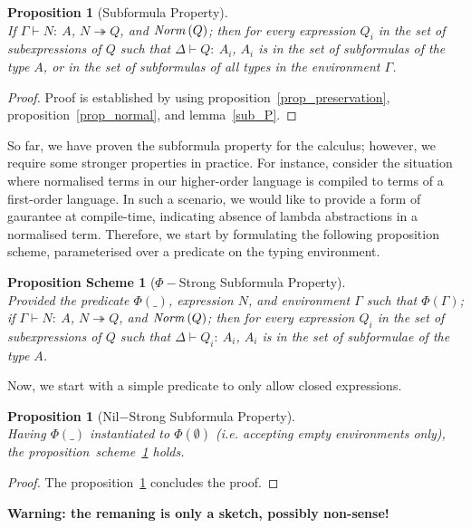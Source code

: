 \documentclass[a4paper]{article}
\newcommand{\typecolor}{}
\newcommand{\termcolor}{}
\newcommand{\tp}[1]{{\typecolor #1}}
\newcommand{\tm}[1]{{\termcolor #1}}
\newtheorem{proposition}[theorem]{Proposition}
\newtheorem{scheme}[theorem]{Proposition Scheme}
\newcommand{\envemp}{\tp{\boldsymbol{\emptyset}}}
\newcommand{\typing}[2]{\tm{#1:\ }\tp{#2}}
\newcommand{\txt}[1]{\text{\textit{#1}}}
\newcommand{\reducestar}[3]{#1 \overset{#2}\twoheadrightarrow #3}
\newcommand{\norm}[1]{\txt{Norm}\,(#1)}
\begin{document}
\begin{proposition}[Subformula Property]\ \\
\label{prop_subformula}
If $\Gamma \vdash \typing{N}{A}$, $\reducestar{N}{}{Q}$, and $\norm{Q}$;
then for every expression $Q_i$ in the set of subexpressions of $Q$ such
that $\Delta \vdash \typing{Q}{A_i}$, $A_i$ is in the set of subformulas of
the type $A$, or in the set of subformulas of all types in the
environment $\Gamma$.
\end{proposition}
\begin{proof}
Proof is established by using proposition~\ref{prop_preservation},
proposition~\ref{prop_normal}, and lemma~\ref{sub_P}.
\end{proof}

So far, we have proven the subformula property for the calculus;
however, we require some stronger properties in practice. For
instance, consider the situation where normalised terms in our
higher-order language is compiled to terms of a first-order
language. In such a scenario, we would like to provide a form of
gaurantee at compile-time, indicating absence of lambda abstractions
in a normalised term. Therefore, we start by formulating the following
proposition scheme, parameterised over a predicate on the typing
environment.

\begin{scheme}[$\Phi-$Strong Subformula Property]\ \\
\label{sub_scheme}
Provided the predicate $\Phi(\_)$, expression $N$, and environment
$\Gamma$ such that $\Phi(\Gamma)$; if $\Gamma \vdash \typing{N}{A}$,
$\reducestar{N}{}{Q}$, and $\norm{Q}$; then for every expression $Q_i$
in the set of subexpressions of $Q$ such that $\Delta \vdash
\typing{Q_i}{A_i}$, $A_i$ is in the set of subformulae of the type
$A$.
\end{scheme}

Now, we start with a simple predicate to only allow closed expressions.
 
\begin{proposition}[Nil$-$Strong Subformula Property]\ \\
Having $\Phi(\_)$ instantiated to $\Phi(\envemp)$ (i.e. accepting empty environments only), the
proposition~scheme~\ref{sub_scheme} holds.
\end{proposition}
\begin{proof}
The proposition~\ref{prop_subformula} concludes the proof.
\end{proof}

\textbf{Warning: the remaning is only a sketch, possibly non-sense!}
\end{document}
